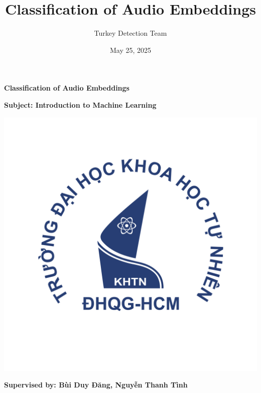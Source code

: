 \documentclass[12pt, a4paper]{article}
\title{Classification of Audio Embeddings}
\author{Turkey Detection Team}
\date{May 25, 2025}
\begin{document}
\begin{titlepage}
    \centering
    \vspace*{2cm}

    \vspace{1.5cm}

    \vspace{1.5cm}
    
    \Huge \textbf{Classification of Audio Embeddings} \\
    
    \vspace{1cm}
    
    \Large \textbf{Subject: Introduction to Machine Learning} \\
        
    \vspace{0.5cm}

    \includegraphics[scale=.40]{img/hcmus-logo.png}\\[1cm]
    
    \vspace{0.5cm}
    
    \large \textbf{Supervised by: Bùi Duy Đăng, Nguyễn Thanh Tình} \\

    \vspace{0.5cm}


\end{titlepage}
\end{document}
